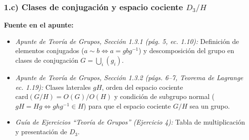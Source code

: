 \documentclass[11pt, a4paper]{article}
\begin{document}
\subsubsection*{1.c) Clases de conjugación y espacio cociente $D_3/H$}
\textbf{Fuente en el apunte:}
\begin{itemize}
    \item \textit{Apunte de Teoría de Grupos, Sección 1.3.1 (pág. 5, ec. 1.10):} Definición de elementos conjugados ($a \sim b \iff a = gbg^{-1}$) y descomposición del grupo en clases de conjugación $G = \bigcup_i (g_i)$.
    \item \textit{Apunte de Teoría de Grupos, Sección 1.3.2 (págs. 6--7, Teorema de Lagrange ec. 1.19):} Clases laterales $gH$, orden del espacio cociente $\text{card}(G/H) = O(G)/O(H)$ y condición de subgrupo normal ($gH = Hg \iff ghg^{-1} \in H$) para que el espacio cociente $G/H$ sea un grupo.
    \item \textit{Guía de Ejercicios ``Teoría de Grupos'' (Ejercicio 4):} Tabla de multiplicación y presentación de $D_3$.
\end{itemize}
\end{document}
